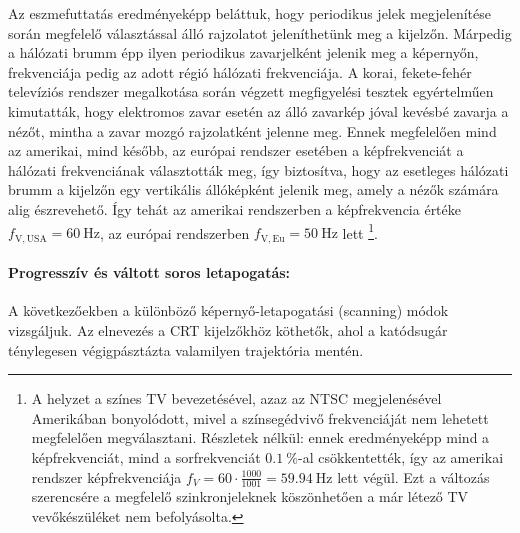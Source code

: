 Az eszmefuttatás eredményeképp beláttuk, hogy periodikus jelek megjelenítése során megfelelő választással álló rajzolatot jeleníthetünk meg a kijelzőn.
Márpedig a hálózati brumm épp ilyen periodikus zavarjelként jelenik meg a képernyőn, frekvenciája pedig az adott régió hálózati frekvenciája.
A korai, fekete-fehér televíziós rendszer megalkotása során végzett megfigyelési tesztek egyértelműen kimutatták, hogy elektromos zavar esetén az álló zavarkép jóval kevésbé zavarja a nézőt, mintha a zavar mozgó rajzolatként jelenne meg.
Ennek megfelelően mind az amerikai, mind később, az európai rendszer esetében a képfrekvenciát a hálózati frekvenciának választották meg, így biztosítva, hogy az esetleges hálózati brumm a kijelzőn egy vertikális állóképként jelenik meg, amely a nézők számára alig észrevehető.
Így tehát az amerikai rendszerben a képfrekvencia értéke $f_{\mathrm{V,USA}} = 60~\mathrm{Hz}$, az európai rendszerben $f_{\mathrm{V,Eu}} = 50~\mathrm{Hz}$ lett \footnote{A helyzet a színes TV bevezetésével, azaz az NTSC megjelenésével Amerikában bonyolódott, mivel a színsegédvivő frekvenciáját nem lehetett megfelelően megválasztani.
Részletek nélkül: ennek eredményeképp mind a képfrekvenciát, mind a sorfrekvenciát $0.1~\%$-al csökkentették, így az amerikai rendszer képfrekvenciája $f_V = 60\cdot \frac{1000}{1001} = 59.94~\mathrm{Hz}$ lett végül. 
Ezt a változás szerencsére a megfelelő szinkronjeleknek köszönhetően a már létező TV vevőkészüléket nem befolyásolta.}.

\paragraph{Progresszív és váltott soros letapogatás:\\}
A következőekben a különböző képernyő-letapogatási (scanning) módok vizsgáljuk.
Az elnevezés a CRT kijelzőkhöz köthetők, ahol a katódsugár ténylegesen végigpásztázta valamilyen trajektória mentén.

